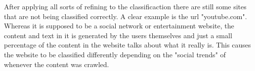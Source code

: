 After applying all sorts of refining to the classificaction there are still some sites that are not being classified correctly. A clear example is the url "youtube.com". Whereas it is supposed to be
a social network or entertainment website, the content and text in it is generated by the users themselves and just a small percentage of the content in the website talks about what it really is.
This causes the website to be classified differently depending on the "social trends" of whenever the content was crawled.
